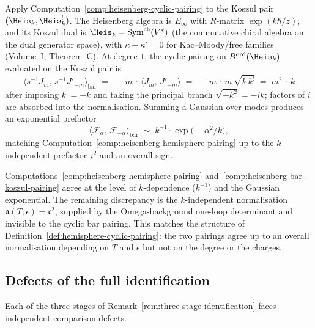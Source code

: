 \begin{computation}
\label{comp:heisenberg-bar-koszul-pairing}
Apply Computation~\ref{comp:heisenberg-cyclic-pairing} to the
Koszul pair $(\Heis_k, \Heis_k^!)$. The Heisenberg
algebra is $E_\infty$ with $R$-matrix $\exp(k\hbar/z)$, and its
Koszul dual is $\Heis_k^! = \mathrm{Sym}^{\mathrm{ch}}(V^*)$ (the commutative chiral algebra on the dual generator space),
with $\kappa + \kappa' = 0$ for Kac--Moody/free families (Volume~I,
Theorem~C). At degree $1$, the cyclic pairing on
$B^{\mathrm{ord}}(\Heis_k)$ evaluated on the Koszul pair is
\[
 \bigl\langle s^{-1}J_m,\, s^{-1}J'_{-m}\bigr\rangle_{\mathrm{bar}}
 \;=\;
 -\,m\,\cdot\,\bigl\langle J_m,\, J'_{-m}\bigr\rangle
 \;=\;
 -\,m\,\cdot\, m\,\sqrt{k\,k^!}
 \;=\;
 m^2\,\cdot\, k
\]
after imposing $k^! = -k$ and taking the principal branch
$\sqrt{-k^2} = -ik$; factors of $i$ are absorbed into the
normalisation. Summing a Gaussian over modes produces an
exponential prefactor
\[
 \bigl\langle \mathcal F_\alpha,\, \mathcal F_{-\alpha}
 \bigr\rangle_{\mathrm{bar}}
 \;\sim\;
 k^{-1}\cdot \exp\!\bigl(-\alpha^2/k\bigr),
\]
matching Computation~\ref{comp:heisenberg-hemisphere-pairing} up
to the $k$-independent prefactor $\mathfrak c^2$ and an
overall sign.
\end{computation}

\begin{remark}
\label{rem:heisenberg-base-case-verification}
Computations~\ref{comp:heisenberg-hemisphere-pairing}
and~\ref{comp:heisenberg-bar-koszul-pairing} agree at the level
of $k$-dependence ($k^{-1}$) and the Gaussian exponential. The
remaining discrepancy is the $k$-independent normalisation
$\mathfrak n(T;\epsilon) = \mathfrak c^2$, supplied by the
Omega-background one-loop determinant and invisible to the
cyclic bar pairing. This matches the structure of
Definition~\ref{def:hemisphere-cyclic-pairing}: the two pairings
agree up to an overall normalisation depending on $T$ and
$\epsilon$ but not on the degree or the charges.
\end{remark}

\subsection{Defects of the full identification}
\label{subsec:hemisphere-cyclic-obstructions}

Each of the three stages of
Remark~\ref{rem:three-stage-identification} faces independent
comparison defects.

